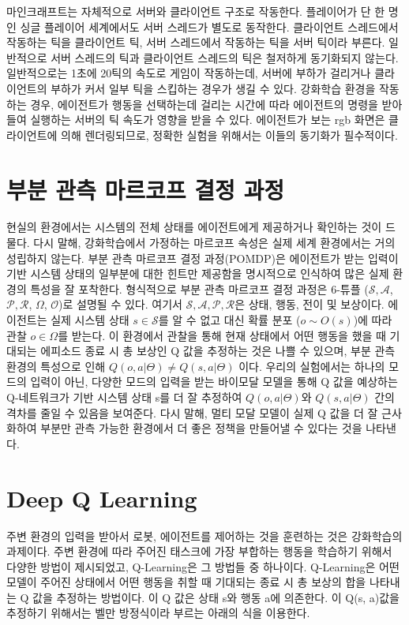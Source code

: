 \documentclass[oneside, under, ko]{snuthesis}
\begin{document}
마인크래프트는 자체적으로 서버와 클라이언트 구조로 작동한다. 플레이어가 단 한 명인 싱글 플레이어 세계에서도 서버 스레드가 별도로 동작한다. 클라이언트 스레드에서 작동하는 틱을 클라이언트 틱, 서버 스레드에서 작동하는 틱을 서버 틱이라 부른다. 일반적으로 서버 스레드의 틱과 클라이언트 스레드의 틱은 철저하게 동기화되지 않는다. 일반적으로는 1초에 20틱의 속도로 게임이 작동하는데, 서버에 부하가 걸리거나 클라이언트의 부하가 커서 일부 틱을 스킵하는 경우가 생길 수 있다. 강화학습 환경을 작동하는 경우, 에이전트가 행동을 선택하는데 걸리는 시간에 따라 에이전트의 명령을 받아들여 실행하는 서버의 틱 속도가 영향을 받을 수 있다. 에이전트가 보는 rgb 화면은 클라이언트에 의해 렌더링되므로, 정확한 실험을 위해서는 이들의 동기화가 필수적이다.

\section{부분 관측 마르코프 결정 과정} 
현실의 환경에서는 시스템의 전체 상태를 에이전트에게 제공하거나 확인하는 것이 드물다. 다시 말해, 강화학습에서 가정하는 마르코프 속성은 실제 세계 환경에서는 거의 성립하지 않는다. 부분 관측 마르코프 결정 과정(POMDP)\cite{POMDP}은 에이전트가 받는 입력이 기반 시스템 상태의 일부분에 대한 힌트만 제공함을 명시적으로 인식하여 많은 실제 환경의 특성을 잘 포착한다. 형식적으로 부분 관측 마르코프 결정 과정은 6-튜플 ($\mathcal{S}, \mathcal{A}$, $\mathcal{P}, \mathcal{R}$, $\Omega$, $\mathcal{O}$)로 설명될 수 있다. 여기서 $\mathcal{S}, \mathcal{A}, \mathcal{P}, \mathcal{R}$은 상태, 행동, 전이 및 보상이다. 에이전트는 실제 시스템 상태 $s \in \mathcal{S}$를 알 수 없고 대신 확률 분포 ($o \sim O(s)$)에 따라 관찰 $o \in \Omega$를 받는다. 이 환경에서 관찰을 통해 현재 상태에서 어떤 행동을 했을 때 기대되는 에피소드 종료 시 총 보상인 Q 값을 추정하는 것은 나쁠 수 있으며, 부분 관측 환경의 특성으로 인해 $Q(o, a|\Theta) \neq Q(s, a|\Theta)$ 이다. 우리의 실험에서는 하나의 모드의 입력이 아닌, 다양한 모드의 입력을 받는 바이모달 모델을 통해 Q 값을 예상하는 Q-네트워크가 기반 시스템 상태 s를 더 잘 추정하여 $Q(o, a|\Theta)$와 $Q(s, a|\Theta)$ 간의 격차를 줄일 수 있음을 보여준다. 다시 말해, 멀티 모달 모델이 실제 Q 값을 더 잘 근사화하여 부분만 관측 가능한 환경에서 더 좋은 정책을 만들어낼 수 있다는 것을 나타낸다.

\section{Deep Q Learning}
주변 환경의 입력을 받아서 로봇, 에이전트를 제어하는 것을 훈련하는 것은 강화학습의 과제이다. 주변 환경에 따라 주어진 태스크에 가장 부합하는 행동을 학습하기 위해서 다양한 방법이 제시되었고, Q-Learning은 그 방법들 중 하나이다. Q-Learning은 어떤 모델이 주어진 상태에서 어떤 행동을 취할 때 기대되는 종료 시 총 보상의 합을 나타내는 Q 값을 추정하는 방법이다. 이 Q 값은 상태 s와 행동 a에 의존한다. 이 Q(s, a)값을 추정하기 위해서는 벨만 방정식이라 부르는 아래의 식을 이용한다.
\end{document}
